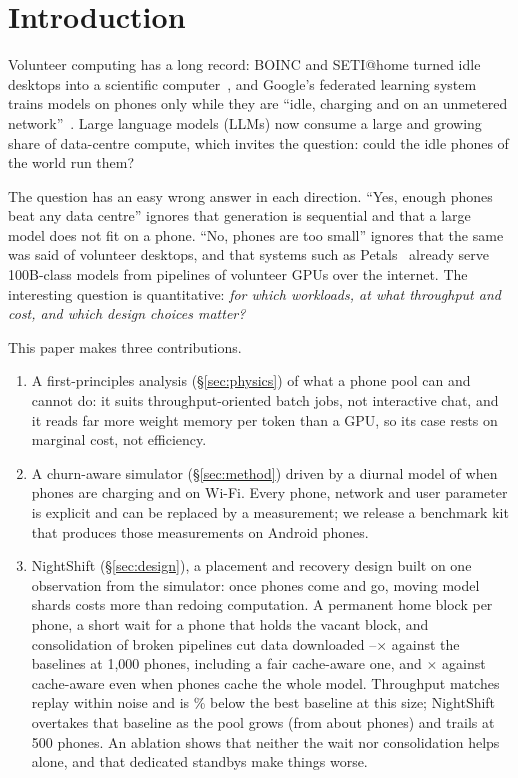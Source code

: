 \documentclass[sigconf,nonacm]{acmart}
\begin{document}
\maketitle

\section{Introduction}

Volunteer computing has a long record: BOINC and SETI@home turned idle desktops
into a scientific computer~\cite{boinc}, and Google's federated learning system
trains models on phones only while they are ``idle, charging and on an
unmetered network''~\cite{bonawitz2019}. Large language models (LLMs) now
consume a large and growing share of data-centre compute, which invites the
question: could the idle phones of the world run them?

The question has an easy wrong answer in each direction. ``Yes, enough
phones beat any data centre'' ignores that generation is sequential and that a
large model does not fit on a phone. ``No, phones are too small'' ignores that
the same was said of volunteer desktops, and that systems such as
Petals~\cite{petals-acl,petals-neurips} already serve 100B-class models from
pipelines of volunteer GPUs over the internet. The interesting question is
quantitative: \emph{for which workloads, at what throughput and cost, and
which design choices matter?}

This paper makes three contributions.
\begin{enumerate}
\item A first-principles analysis (\S\ref{sec:physics}) of what a phone pool
can and cannot do: it suits throughput-oriented batch jobs, not interactive
chat, and it reads far more weight memory per token than a GPU, so its case rests on marginal cost, not efficiency.
\item A churn-aware simulator (\S\ref{sec:method}) driven by a diurnal model of
when phones are charging and on Wi-Fi. Every phone, network and user parameter
is explicit and can be replaced by a measurement; we release a benchmark kit
that produces those measurements on Android phones.
\item NightShift (\S\ref{sec:design}), a placement and recovery design built on
one observation from the simulator: once phones come and go, moving model
shards costs more than redoing computation. A permanent home block per phone,
a short wait for a phone that holds the vacant block, and consolidation of
broken pipelines cut data downloaded \GBRatioBaseMin--\GBRatioBaseMax$\times$
against the baselines at 1,000 phones, including a fair cache-aware one, and
\CacheFullRatioCA$\times$ against cache-aware even when phones cache the whole
model. Throughput matches replay within noise and is \NSbehindConsolPct\% below
the best baseline at this size; NightShift overtakes that baseline as the pool
grows (from about \PoolCross{} phones) and trails at 500 phones. An ablation shows that
neither the wait nor consolidation helps alone, and that dedicated standbys
make things worse.
\end{enumerate}
\end{document}
